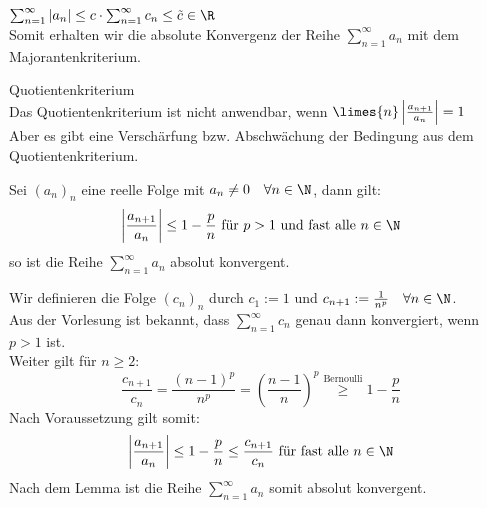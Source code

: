 \documentclass[12pt,a4paper,titlepage,draft]{article}
\begin{document}
	\begin{bem}
		\(\sum_{n=1}^{\infty} |a_n| \leq c \cdot \sum_{n=1}^{\infty} c_n \leq \tilde{c} \in \R\)\\
		Somit erhalten wir die absolute Konvergenz der Reihe \(\sum_{n=1}^{\infty} a_n\) mit dem Majorantenkriterium.
	\end{bem}
	\begin{bem}
		Quotientenkriterium\\
		Das Quotientenkriterium ist nicht anwendbar, wenn \(\limes{n} \left|\frac{a_{n+1}}{a_n}\right| = 1\)\\
		Aber es gibt eine Verschärfung bzw. Abschwächung der Bedingung aus dem Quotientenkriterium.
	\end{bem}
	\begin{kor}
		Sei \((a_n)_n\) eine reelle Folge mit \(a_n \neq 0 \quad \forall n \in \N\), dann gilt:
		\[\left|\frac{a_{n+1}}{a_n}\right| \leq 1 - \frac{p}{n} \text{ für } p > 1 \text{ und fast alle } n \in \N\]
		so ist die Reihe \(\sum_{n=1}^{\infty} a_n\) absolut konvergent.
	\end{kor}
	\begin{bew}
		Wir definieren die Folge \((c_n)_n\) durch \(c_1 := 1\) und \(c_{n+1} := \frac{1}{n^p} \quad \forall n \in \N\).\\
		Aus der Vorlesung ist bekannt, dass \(\sum_{n=1}^{\infty} c_n\) genau dann konvergiert, wenn \(p > 1\) ist.\\
		Weiter gilt für \(n \geq 2\):
		\[\frac{c_{n+1}}{c_n} = \frac{(n-1)^p}{n^p} = \left(\frac{n-1}{n}\right)^p \overset{\text{Bernoulli}}{\geq} 1 - \frac{p}{n}\]
		Nach Voraussetzung gilt somit:
		\[\left|\frac{a_{n+1}}{a_n}\right| \leq 1 - \frac{p}{n} \leq \frac{c_{n+1}}{c_n} \text{ für fast alle } n \in \N\]
		Nach dem Lemma ist die Reihe \(\sum_{n=1}^{\infty} a_n\) somit absolut konvergent.
	\end{bew}
\end{document}
